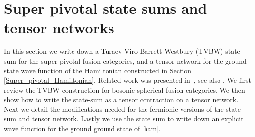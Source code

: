 


\section{Super pivotal state sums and tensor networks} \label{state_sums}


In this section we write down a Turaev-Viro-Barrett-Westbury (TVBW) state sum \cite{Turaev1992,Barrett1996}
for the super pivotal fusion categories, 
and a tensor network for the ground state wave function of the Hamiltonian constructed in Section \ref{Super_pivotal_Hamiltonian}.
Related 
work was presented in~\cite{bhardwaj2016}, 
see also \cite{Bultinck2017, upcoming-paper?}.
We first review the TVBW construction for bosonic spherical fusion categories. 
We then show how to write the state-sum as a tensor contraction on a tensor 
network.
Next we detail the modifications needed for the fermionic versions of the state sum and tensor network.
Lastly we use the state sum to write down an explicit wave function for the ground ground state of \eqref{ham}.

\medskip

